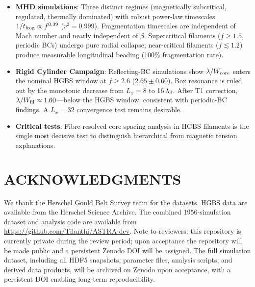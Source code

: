 \documentclass[twoside,twocolumn]{mnras}
\begin{document}
\begin{itemize}
    \item \textbf{MHD simulations}: Three distinct regimes (magnetically subcritical,
    regulated, thermally dominated) with robust power-law timescales
    $1/t_{\rm frag} \propto f^{0.39}$ ($r^2 = 0.999$). Fragmentation timescales are
    independent of Mach number and nearly independent of $\beta$. Supercritical filaments
    ($f \geq 1.5$, periodic BCs) undergo pure radial collapse; near-critical filaments
    ($f \lesssim 1.2$) produce measurable longitudinal beading (100\% fragmentation rate).

    \item \textbf{Rigid Cylinder Campaign}: Reflecting-BC simulations show $\lambda/W_{\rm core}$
    enters the nominal HGBS window at $f \geq 2.6$ ($2.65 \pm 0.60$). Box resonance is
    ruled out by the monotonic decrease from $L_x = 8$ to $16\,\lambda_{\rm J}$.
    After T1 correction, $\lambda/W_{\rm fil} \approx 1.60$---below the HGBS window,
    consistent with periodic-BC findings. A $L_x = 32$ convergence test remains desirable.

    \item \textbf{Critical tests}: Fibre-resolved core spacing analysis in HGBS
    filaments is the single most decisive test to distinguish hierarchical from magnetic
    tension explanations.

\end{itemize}

\section*{ACKNOWLEDGMENTS}

We thank the Herschel Gould Belt Survey team for the datasets. HGBS data are available
from the Herschel Science Archive. The combined 1956-simulation dataset and analysis code are available from
\url{https://github.com/Tilanthi/ASTRA-dev}. Note to reviewers: this repository
is currently private during the review period; upon acceptance the repository will
be made public and a persistent Zenodo DOI will be assigned. The full simulation
dataset, including all HDF5 snapshots, parameter files, analysis scripts, and derived
data products, will be archived on Zenodo upon acceptance, with a persistent DOI enabling
long-term reproducibility.



\end{document}
